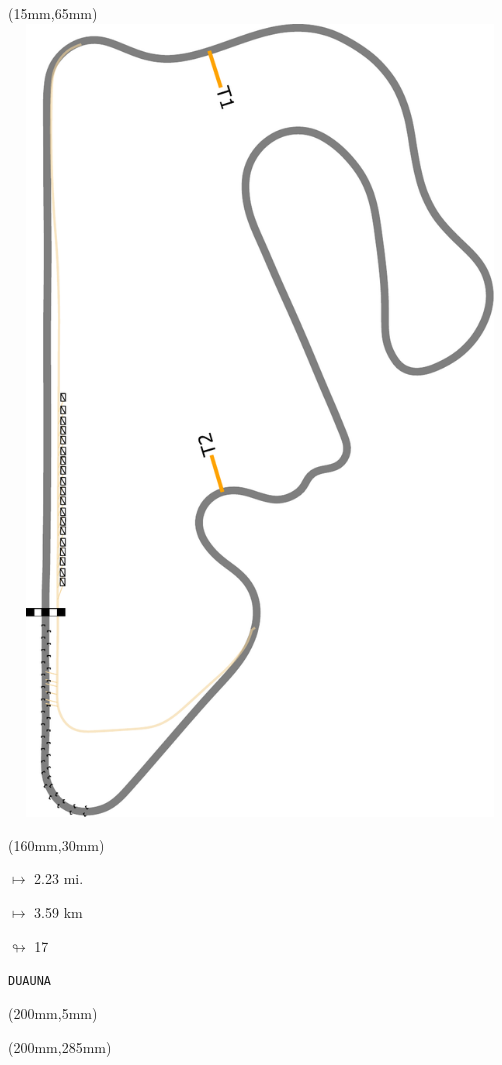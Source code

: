 \begin{textblock*}{185mm}(15mm,65mm)%
\centering
\mbox{\includegraphics[width=185mm,height=210mm,keepaspectratio]{PT/DUAUNA.pdf}}
\end{textblock*}
\begin{textblock*}{40mm}(160mm,30mm)%
\Large
\par$\mapsto$ 2.23 mi.
\par$\mapsto$ 3.59 km
\par$\looparrowright$ 17
\par\hfill\tiny\tt DUAUNA\\
\end{textblock*}
\begin{textblock*}{20mm}(200mm,5mm)%
\fbox{\thepage}
\label{DUAUNA}
\end{textblock*}
\begin{textblock*}{20mm}(200mm,285mm)%
\fbox{\thepage}
\end{textblock*}

